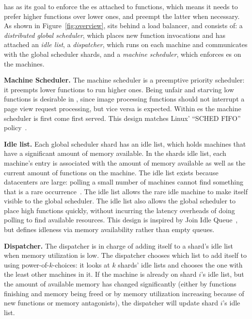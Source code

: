 \Sys{} has as its goal to enforce the \class{}es attached to
functions, which means it needs to prefer higher \class{} functions
over lower ones, and preempt the latter when necessary. As shown in
Figure~\ref{fig:overview}, \sys{} sits behind a load balancer, and
consists of: a \textit{distributed global scheduler}, which places new
function invocations and has attached an \textit{idle list}, a
\textit{dispatcher}, which runs on each machine and communicates with
the global scheduler shards, and a \textit{machine scheduler}, which
enforces \class{}es on the machines.


\textbf{Machine Scheduler.}
The machine scheduler is a preemptive priority scheduler: it preempts lower
\class{} functions to run higher \class{} ones. Being unfair and starving low
\class{} functions is desirable in \sys{}, since image processing functions
should not interrupt a page view request processing, but vice versa is expected.
Within \class{}es the machine scheduler is first come first served. This design
matches Linux' ``SCHED FIFO'' policy~\cite{linux-sched}.


\textbf{Idle list.}  Each global scheduler shard has an idle list,
which holds machines that have a significant amount of memory
available. In the shards idle list, each machine's entry is associated
with the amount of memory available as well as the current amount of
functions on the machine. The idle list exists because datacenters are
large: polling a small number of machines cannot find something that
is a rare occurrence~\cite{join-idle-queue}. The idle list allows the
rare idle machine to make itself visible to the global scheduler. The
idle list also allows the global scheduler to place high \class{}
functions quickly, without incurring the latency overheads of doing
polling to find available resources. This design is inspired by Join
Idle Queue~\cite{join-idle-queue}, but defines idleness via memory
availability rather than empty queues.


\textbf{Dispatcher.}
The dispatcher is in charge of adding itself to a shard's idle list when memory
utilization is low. The dispatcher chooses which list to add itself to using
power-of-$k$-choices: it looks at $k$ shards' idle lists and chooses the one with
the least other machines in it. If the machine is already on shard $i$'s idle
list, but the amount of available memory has changed significantly (either by
functions finishing and memory being freed or by memory utilization increasing
because of new functions or memory antagonists), the dispatcher will update
shard $i$'s idle list.

